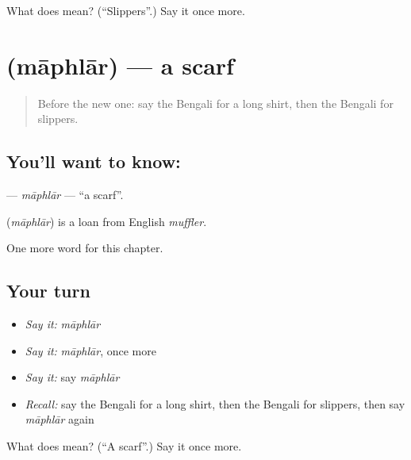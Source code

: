 \begin{tcolorbox}[breakable,colback=teal!4,colframe=teal!35!black,title={Before you move on}]
What does  mean? (\textquotedblleft{}Slippers\textquotedblright{}.) Say it once more.
\end{tcolorbox}
\section[\texorpdfstring{\bn{মাফলার} (māphlār)}{মাফলার (māphlār)}]{ (māphlār) — a scarf}

\label{lesson:BN-C120-maphlar}



\begin{quote}
Before the new one: say the Bengali for a long shirt, then the Bengali for slippers.
\end{quote}

\subsection*{You'll want to know: }
\textbf{} — \emph{māphlār} — \textquotedblleft{}a scarf\textquotedblright{}.

\begin{cousinweb}
\textbf{} (\emph{māphlār}) is a loan from English \emph{muffler}.
\end{cousinweb}

\begin{grammarlens}[title={What you've built}]
One more word for this chapter.
\end{grammarlens}

\subsection*{Your turn}
\begin{itemize}
\raggedright
  \item \emph{Say it:} \emph{māphlār}
  \item \emph{Say it:} \emph{māphlār}, once more
  \item \emph{Say it:} say \emph{māphlār}
  \item \emph{Recall:} say the Bengali for a long shirt, then the Bengali for slippers, then say \emph{māphlār} again
\end{itemize}

\begin{tcolorbox}[breakable,colback=teal!4,colframe=teal!35!black,title={Before you move on}]
What does  mean? (\textquotedblleft{}A scarf\textquotedblright{}.) Say it once more.
\end{tcolorbox}
